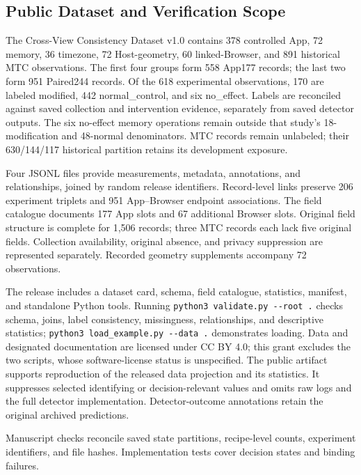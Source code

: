 \hypertarget{app:4}{%
\subsection{Public Dataset and Verification Scope}\label{app:4}}

The Cross-View Consistency Dataset v1.0 contains 378 controlled App, 72 memory, 36 timezone, 72 Host-geometry, 60 linked-Browser, and 891 historical MTC observations. The first four groups form 558 App177 records; the last two form 951 Paired244 records. Of the 618 experimental observations, 170 are labeled modified, 442 normal\_\allowbreak{}control, and six no\_\allowbreak{}effect. Labels are reconciled against saved collection and intervention evidence, separately from saved detector outputs. The six no-effect memory operations remain outside that study's 18-modification and 48-normal denominators. MTC records remain unlabeled; their 630/144/117 historical partition retains its development exposure.

Four JSONL files provide measurements, metadata, annotations, and relationships, joined by random release identifiers. Record-level links preserve 206 experiment triplets and 951 App--Browser endpoint associations. The field catalogue documents 177 App slots and 67 additional Browser slots. Original field structure is complete for 1,506 records; three MTC records each lack five original fields. Collection availability, original absence, and privacy suppression are represented separately. Recorded geometry supplements accompany 72 observations.

The release includes a dataset card, schema, field catalogue, statistics, manifest, and standalone Python tools. Running \texttt{python3 validate.py -{}-root .} checks schema, joins, label consistency, missingness, relationships, and descriptive statistics; \texttt{python3 load\_example.py -{}-data .} demonstrates loading. Data and designated documentation are licensed under CC BY 4.0; this grant excludes the two scripts, whose software-license status is unspecified. The public artifact supports reproduction of the released data projection and its statistics. It suppresses selected identifying or decision-relevant values and omits raw logs and the full detector implementation. Detector-outcome annotations retain the original archived predictions.

Manuscript checks reconcile saved state partitions, recipe-level counts, experiment identifiers, and file hashes. Implementation tests cover decision states and binding failures.

